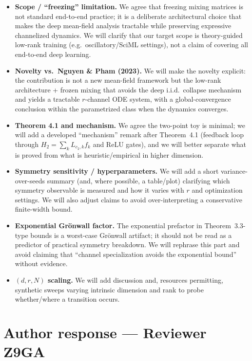 \documentclass[11pt,a4paper]{article}
\newcommand{\NP}{Nguyen \& Pham (2023)}
\begin{document}
\begin{itemize}
  \item \textbf{Scope / ``freezing'' limitation.} We agree that freezing mixing matrices is not standard end-to-end practice; it is a deliberate architectural choice that makes the deep mean-field analysis tractable while preserving expressive channelized dynamics. We will clarify that our target scope is theory-guided low-rank training (e.g.\ oscillatory/SciML settings), not a claim of covering all end-to-end deep learning.
  \item \textbf{Novelty vs.\ \NP{}.} We will make the novelty explicit: the contribution is not a new mean-field framework but the low-rank architecture + frozen mixing that avoids the deep i.i.d.\ collapse mechanism and yields a tractable $r$-channel ODE system, with a global-convergence conclusion within the parametrized class when the dynamics converges.
  \item \textbf{Theorem 4.1 and mechanism.} We agree the two-point toy is minimal; we will add a developed ``mechanism'' remark after Theorem~4.1 (feedback loop through $H_2=\sum_k L_{c_2,k}f_k$ and ReLU gates), and we will better separate what is proved from what is heuristic/empirical in higher dimension.
  \item \textbf{Symmetry sensitivity / hyperparameters.} We will add a short variance-over-seeds summary (and, where possible, a table/plot) clarifying which symmetry observable is measured and how it varies with $r$ and optimization settings. We will also adjust claims to avoid over-interpreting a conservative finite-width bound.
  \item \textbf{Exponential Grönwall factor.} The exponential prefactor in Theorem~3.3-type bounds is a worst-case Grönwall artifact; it should not be read as a predictor of practical symmetry breakdown. We will rephrase this part and avoid claiming that ``channel specialization avoids the exponential bound'' without evidence.
  \item \textbf{$(d,r,N)$ scaling.} We will add discussion and, resources permitting, synthetic sweeps varying intrinsic dimension and rank to probe whether/where a transition occurs.
\end{itemize}

\section*{Author response --- Reviewer Z9GA}
\end{document}
